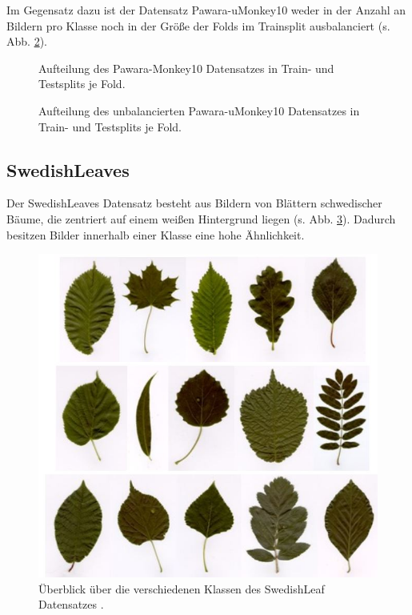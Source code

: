 Im Gegensatz dazu ist der Datensatz Pawara-uMonkey10 weder in der Anzahl an Bildern pro Klasse noch in der Größe der Folds im Trainsplit ausbalanciert (s. Abb. \ref{fig:Pawara-uMonkey10Zusammensetzung}). 


\begin{figure}[H]
\begin{adjustbox}{width=1.2\textwidth, center}

\end{adjustbox}
\caption{Aufteilung des Pawara-Monkey10 Datensatzes \cite{pawaraWebsiteDatensaetze} in Train- und Testsplits je Fold.}
\label{fig:Pawara-Monkey10Zusammensetzung}
\end{figure}
\begin{figure}[H]
\begin{adjustbox}{width=1.2\textwidth, center}

\end{adjustbox}
\caption{Aufteilung des unbalancierten Pawara-uMonkey10 Datensatzes \cite{pawaraWebsiteDatensaetze} in Train- und Testsplits je Fold.}
\label{fig:Pawara-uMonkey10Zusammensetzung}
\end{figure}





\subsection{SwedishLeaves}
\label{ch:methodik_SwedishLeaves}
Der SwedishLeaves Datensatz besteht aus Bildern von Blättern schwedischer Bäume, die zentriert auf einem weißen Hintergrund liegen (s. Abb. \ref{fig:swedishLeavesUeberblick}). Dadurch besitzen Bilder innerhalb einer Klasse eine hohe Ähnlichkeit.

\begin{figure}[H]
\centering
\includegraphics[scale=0.8]{img/2_swedishLeaves-image.jpg}
\caption{Überblick über die verschiedenen Klassen des SwedishLeaf Datensatzes \cite{pawaraMonkey}.}
\label{fig:swedishLeavesUeberblick}
\end{figure}

